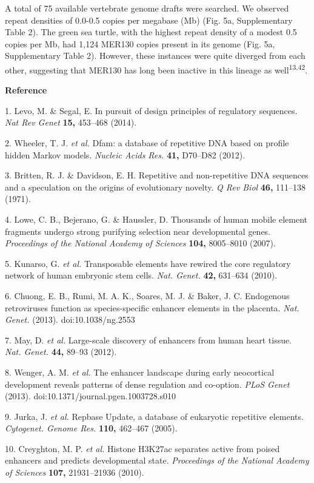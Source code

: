 \documentclass[]{article}
\begin{document}
A total of 75 available vertebrate genome drafts were searched. We
observed repeat densities of 0.0-0.5 copies per megabase (Mb) (Fig. 5a,
Supplementary Table 2). The green sea turtle, with the highest repeat
density of a modest 0.5 copies per Mb, had 1,124 MER130 copies present
in its genome (Fig. 5a, Supplementary Table 2). However, these instances
were quite diverged from each other, suggesting that MER130 has long
been inactive in this lineage as well\textsuperscript{13,42}.

\textbf{Reference}

1. Levo, M. \& Segal, E. In pursuit of design principles of regulatory
sequences. \emph{Nat Rev Genet} \textbf{15,} 453--468 (2014).

2. Wheeler, T. J. \emph{et al.} Dfam: a database of repetitive DNA based
on profile hidden Markov models. \emph{Nucleic Acids Res.} \textbf{41,}
D70--D82 (2012).

3. Britten, R. J. \& Davidson, E. H. Repetitive and non-repetitive DNA
sequences and a speculation on the origins of evolutionary novelty.
\emph{Q Rev Biol} \textbf{46,} 111--138 (1971).

4. Lowe, C. B., Bejerano, G. \& Haussler, D. Thousands of human mobile
element fragments undergo strong purifying selection near developmental
genes. \emph{Proceedings of the National Academy of Sciences}
\textbf{104,} 8005--8010 (2007).

5. Kunarso, G. \emph{et al.} Transposable elements have rewired the core
regulatory network of human embryonic stem cells. \emph{Nat. Genet.}
\textbf{42,} 631--634 (2010).

6. Chuong, E. B., Rumi, M. A. K., Soares, M. J. \& Baker, J. C.
Endogenous retroviruses function as species-specific enhancer elements
in the placenta. \emph{Nat. Genet.} (2013). doi:10.1038/ng.2553

7. May, D. \emph{et al.} Large-scale discovery of enhancers from human
heart tissue. \emph{Nat. Genet.} \textbf{44,} 89--93 (2012).

8. Wenger, A. M. \emph{et al.} The enhancer landscape during early
neocortical development reveals patterns of dense regulation and
co-option. \emph{PLoS Genet} (2013).
doi:10.1371/journal.pgen.1003728.s010

9. Jurka, J. \emph{et al.} Repbase Update, a database of eukaryotic
repetitive elements. \emph{Cytogenet. Genome Res.} \textbf{110,}
462--467 (2005).

10. Creyghton, M. P. \emph{et al.} Histone H3K27ac separates active from
poised enhancers and predicts developmental state. \emph{Proceedings of
the National Academy of Sciences} \textbf{107,} 21931--21936 (2010).
\end{document}
